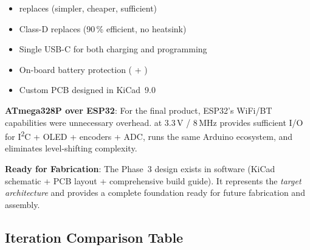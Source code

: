 \medskip\noindent
{}

\begin{itemize}[nosep]
    \item {} replaces  (simpler, cheaper, sufficient)
    \item {} Class-D replaces  (90\,\% efficient, no heatsink)
    \item Single USB-C for both charging and programming
    \item On-board battery protection ( + )
    \item Custom PCB designed in KiCad~9.0
\end{itemize}

\begin{calloutdecision}
\textbf{ATmega328P over ESP32}: For the final product, ESP32's WiFi/BT
capabilities were unnecessary overhead.   at 3.3\,V /
8\,MHz provides sufficient I/O for I\textsuperscript{2}C + OLED + encoders +
ADC, runs the same Arduino ecosystem, and eliminates level-shifting
complexity.
\end{calloutdecision}

\begin{calloutnote}
\textbf{Ready for Fabrication}: The Phase~3 design exists in software
(KiCad schematic + PCB layout + comprehensive build guide). It represents the \emph{target architecture}
and provides a complete foundation ready for future fabrication and assembly.
\end{calloutnote}


\subsection{Iteration Comparison Table}

